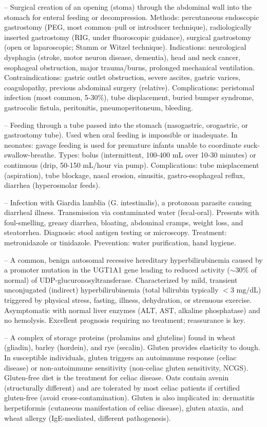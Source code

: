 -- Surgical creation of an opening (stoma) through the abdominal wall into the stomach for enteral feeding or decompression. Methods: percutaneous endoscopic gastrostomy (PEG, most common--pull or introducer technique), radiologically inserted gastrostomy (RIG, under fluoroscopic guidance), surgical gastrostomy (open or laparoscopic; Stamm or Witzel technique). Indications: neurological dysphagia (stroke, motor neuron disease, dementia), head and neck cancer, esophageal obstruction, major trauma/burns, prolonged mechanical ventilation. Contraindications: gastric outlet obstruction, severe ascites, gastric varices, coagulopathy, previous abdominal surgery (relative). Complications: peristomal infection (most common, 5-30\%), tube displacement, buried bumper syndrome, gastrocolic fistula, peritonitis, pneumoperitoneum, bleeding.

-- Feeding through a tube passed into the stomach (nasogastric, orogastric, or gastrostomy tube). Used when oral feeding is impossible or inadequate. In neonates: gavage feeding is used for premature infants unable to coordinate suck-swallow-breathe. Types: bolus (intermittent, 100-400 mL over 10-30 minutes) or continuous (drip, 50-150 mL/hour via pump). Complications: tube misplacement (aspiration), tube blockage, nasal erosion, sinusitis, gastro-esophageal reflux, diarrhea (hyperosmolar feeds).

-- Infection with Giardia lamblia (G. intestinalis), a protozoan parasite causing diarrheal illness. Transmission via contaminated water (fecal-oral). Presents with foul-smelling, greasy diarrhea, bloating, abdominal cramps, weight loss, and steatorrhea. Diagnosis: stool antigen testing or microscopy. Treatment: metronidazole or tinidazole. Prevention: water purification, hand hygiene.

-- A common, benign autosomal recessive hereditary hyperbilirubinemia caused by a promoter mutation in the UGT1A1 gene leading to reduced activity ($\sim 30\%$ of normal) of UDP-glucuronosyltransferase. Characterized by mild, transient unconjugated (indirect) hyperbilirubinemia (total bilirubin typically $<3\text{ mg/dL}$) triggered by physical stress, fasting, illness, dehydration, or strenuous exercise. Asymptomatic with normal liver enzymes (ALT, AST, alkaline phosphatase) and no hemolysis. Excellent prognosis requiring no treatment; reassurance is key.

-- A complex of storage proteins (prolamins and glutelins) found in wheat (gliadin), barley (hordein), and rye (secalin). Gluten provides elasticity to dough. In susceptible individuals, gluten triggers an autoimmune response (celiac disease) or non-autoimmune sensitivity (non-celiac gluten sensitivity, NCGS). Gluten-free diet is the treatment for celiac disease. Oats contain avenin (structurally different) and are tolerated by most celiac patients if certified gluten-free (avoid cross-contamination). Gluten is also implicated in: dermatitis herpetiformis (cutaneous manifestation of celiac disease), gluten ataxia, and wheat allergy (IgE-mediated, different pathogenesis).

